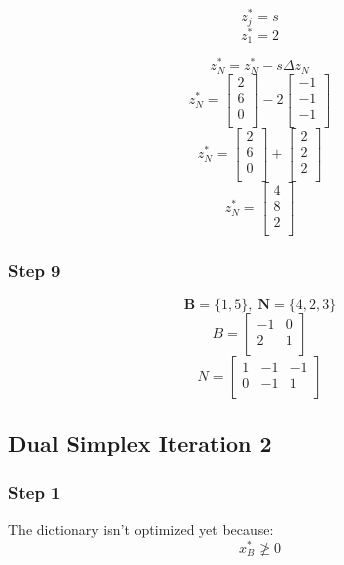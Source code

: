 \documentclass[14pt]{extarticle}
\begin{document}
\[
    z^*_j = s
\]
\[
    z^*_1 = 2
\]

\[
    z^*_N = z^*_N - s \Delta z_N
\]
\[
    z^*_N = \begin{bmatrix}
        2 \\
        6 \\
        0 \\
    \end{bmatrix}
    - 2 \begin{bmatrix}
        -1 \\
        -1 \\
        -1 \\
    \end{bmatrix}
\]
\[
    z^*_N = \begin{bmatrix}
        2 \\
        6 \\
        0 \\
    \end{bmatrix}
    + \begin{bmatrix}
        2 \\
        2 \\
        2 \\
    \end{bmatrix}
\]
\[
    z^*_N = \begin{bmatrix}
        4 \\
        8 \\
        2 \\
    \end{bmatrix}
\]

\subsubsection*{Step 9}
\[
    \boldsymbol{B} = \{1, 5\},\ \boldsymbol{N} = \{4, 2, 3\}
\]
\[
    B = \begin{bmatrix}
        -1 & 0 \\
        2 & 1 \\
    \end{bmatrix}
\]
\[
    N = \begin{bmatrix}
        1 & -1 & -1 \\
        0 & -1 & 1 \\
    \end{bmatrix}
\]

\subsection*{Dual Simplex Iteration 2}
\subsubsection*{Step 1}
The dictionary isn't optimized yet because:
\[
    x^*_B \ngeq 0
\]
\end{document}
